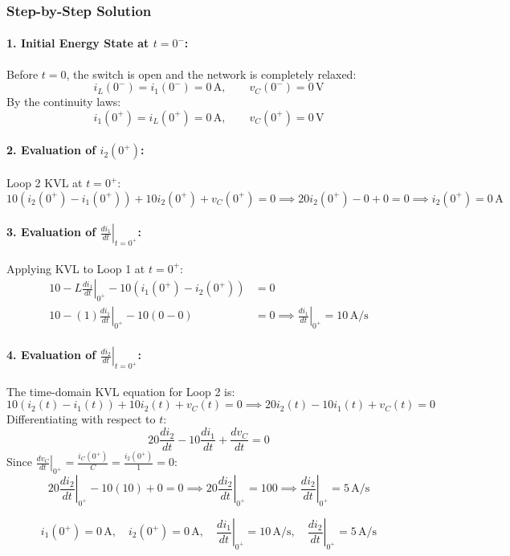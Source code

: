 \documentclass[11pt,a4paper,oneside]{article}
\begin{document}
\subsubsection*{Step-by-Step Solution}
\paragraph{1. Initial Energy State at $t = 0^-$:}
Before $t=0$, the switch is open and the network is completely relaxed:
\[
i_L(0^-) = i_1(0^-) = 0\,\mathrm{A}, \qquad v_C(0^-) = 0\,\mathrm{V}
\]
By the continuity laws:
\[
i_1(0^+) = i_L(0^+) = 0\,\mathrm{A}, \qquad v_C(0^+) = 0\,\mathrm{V}
\]
\paragraph{2. Evaluation of $i_2(0^+)$:}
Loop 2 KVL at $t=0^+$:
\[
10(i_2(0^+) - i_1(0^+)) + 10 i_2(0^+) + v_C(0^+) = 0 \implies 20 i_2(0^+) - 0 + 0 = 0 \implies i_2(0^+) = 0\,\mathrm{A}
\]
\paragraph{3. Evaluation of $\left.\frac{di_1}{dt}\right|_{t=0^+}$:}
Applying KVL to Loop 1 at $t=0^+$:
\begin{align*}
  10 - L \left.\frac{di_1}{dt}\right|_{0^+} - 10(i_1(0^+) - i_2(0^+)) &= 0 \\
  10 - (1) \left.\frac{di_1}{dt}\right|_{0^+} - 10(0 - 0) &= 0 \implies \left.\frac{di_1}{dt}\right|_{0^+} = 10\,\mathrm{A/s}
\end{align*}
\paragraph{4. Evaluation of $\left.\frac{di_2}{dt}\right|_{t=0^+}$:}
The time-domain KVL equation for Loop 2 is:
\[
10(i_2(t) - i_1(t)) + 10 i_2(t) + v_C(t) = 0 \implies 20 i_2(t) - 10 i_1(t) + v_C(t) = 0
\]
Differentiating with respect to $t$:
\[
20 \frac{di_2}{dt} - 10 \frac{di_1}{dt} + \frac{dv_C}{dt} = 0
\]
Since $\left.\frac{dv_C}{dt}\right|_{0^+} = \frac{i_C(0^+)}{C} = \frac{i_2(0^+)}{1} = 0$:
\[
20 \left.\frac{di_2}{dt}\right|_{0^+} - 10(10) + 0 = 0 \implies 20 \left.\frac{di_2}{dt}\right|_{0^+} = 100 \implies \left.\frac{di_2}{dt}\right|_{0^+} = 5\,\mathrm{A/s}
\]

\begin{answerbox}
\[
i_1(0^+) = 0\,\mathrm{A}, \quad i_2(0^+) = 0\,\mathrm{A}, \quad \left.\frac{di_1}{dt}\right|_{0^+} = 10\,\mathrm{A/s}, \quad \left.\frac{di_2}{dt}\right|_{0^+} = 5\,\mathrm{A/s}
\]
\end{answerbox}
\end{document}

